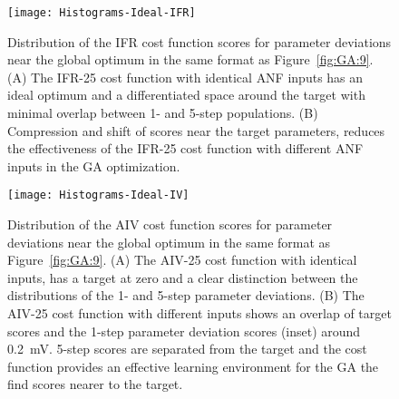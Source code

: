   \begin{figure}[htb]
    \centering
    \texttt{[image: Histograms-Ideal-IFR]}

    \caption{Distribution of the IFR cost function scores for
      parameter deviations near the global optimum in the same format
      as Figure~\ref{fig:GA:9}.  (A) The IFR-25 cost function with
      identical {ANF} inputs has an ideal optimum and a differentiated
      space around the target with minimal overlap between 1- and
      5-step populations. (B) Compression and shift of scores near the
      target parameters, reduces the effectiveness of the IFR-25 cost
      function with different {ANF} inputs in the {GA} optimization. %
    }
    \label{fig:GA:10}
  \end{figure}



  \begin{figure}[htb]
    \centering
    \texttt{[image: Histograms-Ideal-IV]}
    \caption{Distribution of the AIV cost function scores for
      parameter deviations near the global optimum in the same format
      as Figure~\ref{fig:GA:9}.  (A) The AIV-25 cost function with
      identical inputs, has a target at zero and a clear distinction
      between the distributions of the 1- and 5-step parameter
      deviations.  (B) The AIV-25 cost function with different inputs
      shows an overlap of target scores and the 1-step parameter
      deviation scores (inset) around 0.2~mV. 5-step scores are
      separated from the target and the cost function provides an
      effective learning environment for the {GA} the find scores nearer
      to the target. %
    }
    \label{fig:GA:11}
  \end{figure}


